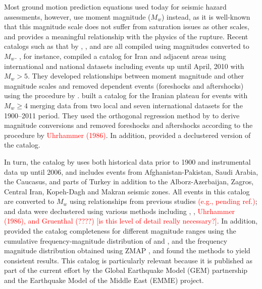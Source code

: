 Most ground motion prediction equations used today for seismic hazard assessments, however, use moment magnitude ($M_w$) instead, as it is well-known that this magnitude scale does not suffer from saturation issues as other scales, and provides a meaningful relationship with the physics of the rupture. Recent catalogs such as that by \citet{Karimiparidari2013}, \citet{Shahvar2013}, and \citet{Zare2014} are all compiled using magnitudes converted to $M_w$. \citet{Karimiparidari2013}, for instance, compiled a catalog for Iran and adjacent areas using international and national datasets including events up until April, 2010 with $M_w > 5$. They developed relationships between moment magnitude and other magnitude scales and removed dependent events (foreshocks and aftershocks) using the procedure by \citet{Gardner1974}. \citet{Shahvar2013} built a catalog for the Iranian plateau for events with $M_w \geq 4$ merging data from two local and seven international datasets for the 1900--2011 period. They used the orthogonal regression method by \citet{Castellaro2006} to derive magnitude conversions and removed foreshocks and aftershocks according to the procedure by \textcolor{red}{Uhrhammer (1986)}. In addition, \citet{Shahvar2013} provided a declustered version of the catalog. 

In turn, the catalog by \citet{Zare2014} uses both historical data prior to 1900 and instrumental data up until 2006, and includes events from Afghanistan-Pakis\-tan, Saudi Arabia, the Caucasus, and parts of Turkey in addition to the Alborz-Azerbaijan, Zagros, Central Iran, Kopeh-Dagh and Makran seismic zones. All events in this catalog are converted to $M_w$ using relationships from previous studies \textcolor{red}{(e.g., pending ref.)}; and data were declustered using various methods including \citet{Gardner1974}, \citet{Reasenberg1985}, \textcolor{red}{Uhrhammer (1986), and Gruenthal (????) [is this level of detail really necessary?]}. In addition, \citet{Zare2014} provided the catalog completeness for different magnitude ranges using the cumulative frequency-magnitude distribution of \citet{Gutenberg1944} and \citet{richter1958}, and the frequency magnitude distribution obtained using ZMAP \citep{Wiemer2001}, and found the methods to yield consistent results. This catalog is particularly relevant because it is published as part of the current effort by the Global Earthquake Model (GEM) partnership and the Earthquake Model of the Middle East (EMME) project.

